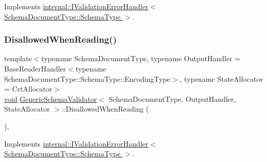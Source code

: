Implements \hyperlink{classinternal_1_1IValidationErrorHandler_a67531a59c1dd8db20db72b17f0933d03}{internal\+::\+I\+Validation\+Error\+Handler$<$ Schema\+Document\+Type\+::\+Schema\+Type $>$}.

\mbox{\label{classGenericSchemaValidator_aa8bee0b3cbf45421151cf1b4040c4df7}} 
\subsubsection{\texorpdfstring{Disallowed\+When\+Reading()}{DisallowedWhenReading()}}
{\footnotesize\ttfamily template$<$typename Schema\+Document\+Type, typename Output\+Handler = Base\+Reader\+Handler$<$typename Schema\+Document\+Type\+::\+Schema\+Type\+::\+Encoding\+Type$>$, typename State\+Allocator = Crt\+Allocator$>$ \\
\hyperlink{imgui__impl__opengl3__loader_8h_ac668e7cffd9e2e9cfee428b9b2f34fa7}{void} \hyperlink{classGenericSchemaValidator}{Generic\+Schema\+Validator}$<$ Schema\+Document\+Type, Output\+Handler, State\+Allocator $>$\+::Disallowed\+When\+Reading (\begin{DoxyParamCaption}{ }\end{DoxyParamCaption})\hspace{0.3cm}{\ttfamily [inline]}, {\ttfamily [virtual]}}



Implements \hyperlink{classinternal_1_1IValidationErrorHandler_ac53a7125383d8051f4522ea222c3c5d5}{internal\+::\+I\+Validation\+Error\+Handler$<$ Schema\+Document\+Type\+::\+Schema\+Type $>$}.

\mbox{\label{classGenericSchemaValidator_aa66173c9e71ed6143fa2b35ce777f36a}} 

